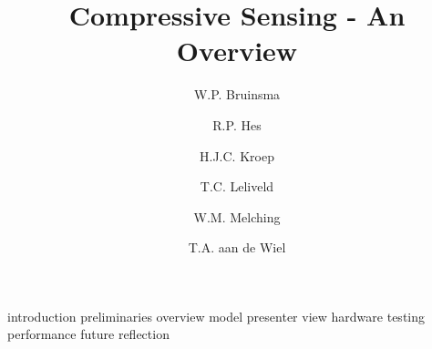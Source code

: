 \documentclass[a4paper, openany, oneside]{memoir}
\title{Compressive Sensing - An Overview}
\author{W.P. Bruinsma \and R.P. Hes \and H.J.C. Kroep \and T.C. Leliveld \and W.M. Melching \and T.A. aan de Wiel}
\begin{document}
{introduction}
{preliminaries}
{overview}
{model}
{presenter}
{view}
{hardware}
{testing}
{performance}
{future}
{reflection}
\end{document}
